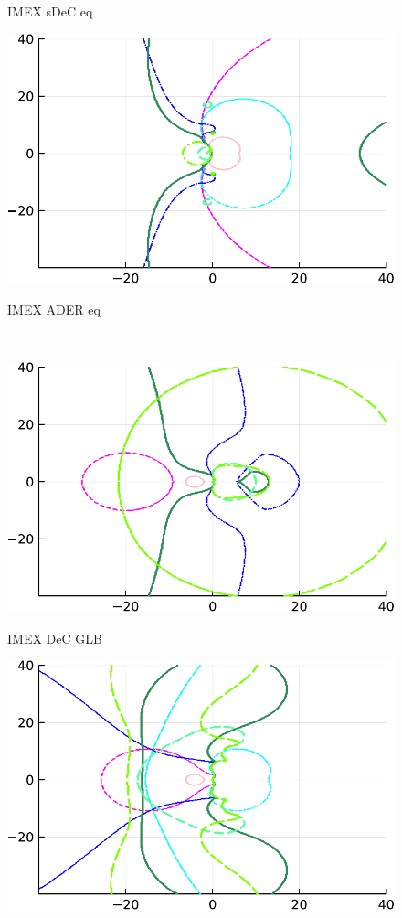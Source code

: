 \begin{figure}
\begin{minipage}[t]{0.32\textwidth}
	\centerline{IMEX sDeC eq}
	\end{minipage}
	\begin{minipage}[t]{0.32\textwidth}
	\includegraphics[width=\textwidth]{pdf/odepics/ImExD1_IMEXADER_equispaced_range=40-crop.pdf}
	\centerline{IMEX ADER eq}
	\end{minipage}\\
	\begin{minipage}[t]{0.32\textwidth}
	\includegraphics[width=\textwidth]{pdf/odepics/ImExD1_IMEXDeC_gaussLobatto_range=40-crop.pdf}
	\centerline{IMEX DeC GLB}
	\end{minipage}
	\begin{minipage}[t]{0.32\textwidth}
	\includegraphics[width=\textwidth]{pdf/odepics/ImExD1_IMEXDeC_subtimesteps_gaussLobatto_range=40-crop.pdf}

\end{minipage}
\end{figure}
